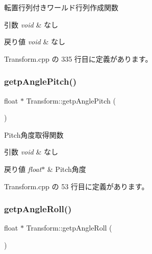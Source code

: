転置行列付きワールド行列作成関数 


\begin{DoxyParams}{引数}
{\em void} & なし \\
\hline
\end{DoxyParams}

\begin{DoxyRetVals}{戻り値}
{\em void} & なし \\
\hline
\end{DoxyRetVals}


 Transform.\+cpp の 335 行目に定義があります。

\mbox{\label{class_transform_a85ecb6a9d972caf0ab7d2e58ad2753b7}} 
\subsubsection{\texorpdfstring{getp\+Angle\+Pitch()}{getpAnglePitch()}}
{\footnotesize\ttfamily float $\ast$ Transform\+::getp\+Angle\+Pitch (\begin{DoxyParamCaption}{ }\end{DoxyParamCaption})}



Pitch角度取得関数 


\begin{DoxyParams}{引数}
{\em void} & なし \\
\hline
\end{DoxyParams}

\begin{DoxyRetVals}{戻り値}
{\em float$\ast$} & Pitch角度 \\
\hline
\end{DoxyRetVals}


 Transform.\+cpp の 53 行目に定義があります。

\mbox{\label{class_transform_aa1f056b8f90affed5e251e68a93331d4}} 
\subsubsection{\texorpdfstring{getp\+Angle\+Roll()}{getpAngleRoll()}}
{\footnotesize\ttfamily float $\ast$ Transform\+::getp\+Angle\+Roll (\begin{DoxyParamCaption}{ }\end{DoxyParamCaption})}



